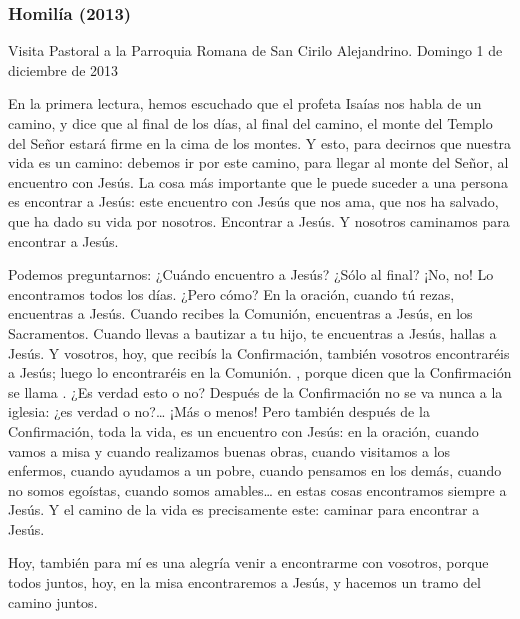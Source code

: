 \begin{body}
{\subsubsection{Homilía (2013)}
Visita Pastoral a la Parroquia Romana de San Cirilo Alejandrino. Domingo 1 de diciembre de 2013}

En la primera lectura, hemos escuchado que el profeta Isaías nos habla de un camino, y dice que al final de los días, al final del camino, el monte del Templo del Señor estará firme en la cima de los montes. Y esto, para decirnos que nuestra vida es un camino: debemos ir por este camino, para llegar al monte del Señor, al encuentro con Jesús. La cosa más importante que le puede suceder a una persona es encontrar a Jesús: este encuentro con Jesús que nos ama, que nos ha salvado, que ha dado su vida por nosotros. Encontrar a Jesús. Y nosotros caminamos para encontrar a Jesús.

Podemos preguntarnos: ¿Cuándo encuentro a Jesús? ¿Sólo al final? ¡No, no! Lo encontramos todos los días. ¿Pero cómo? En la oración, cuando tú rezas, encuentras a Jesús. Cuando recibes la Comunión, encuentras a Jesús, en los Sacramentos. Cuando llevas a bautizar a tu hijo, te encuentras a Jesús, hallas a Jesús. Y vosotros, hoy, que recibís la Confirmación, también vosotros encontraréis a Jesús; luego lo encontraréis en la Comunión. , porque dicen que la Confirmación se llama . ¿Es verdad esto o no? Después de la Confirmación no se va nunca a la iglesia: ¿es verdad o no?\ldots{} ¡Más o menos! Pero también después de la Confirmación, toda la vida, es un encuentro con Jesús: en la oración, cuando vamos a misa y cuando realizamos buenas obras, cuando visitamos a los enfermos, cuando ayudamos a un pobre, cuando pensamos en los demás, cuando no somos egoístas, cuando somos amables\ldots{} en estas cosas encontramos siempre a Jesús. Y el camino de la vida es precisamente este: caminar para encontrar a Jesús.

Hoy, también para mí es una alegría venir a encontrarme con vosotros, porque todos juntos, hoy, en la misa encontraremos a Jesús, y hacemos un tramo del camino juntos.


\end{body}
